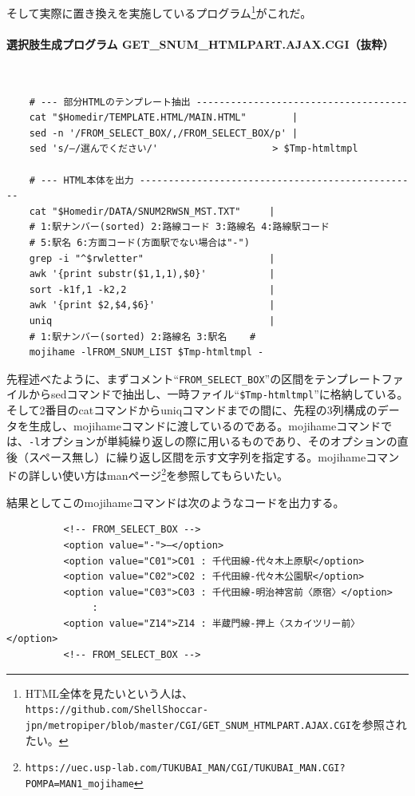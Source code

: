 そして実際に置き換えを実施しているプログラム\footnote{HTML全体を見たいという人は、\\ \verb|https://github.com/ShellShoccar-jpn/metropiper/blob/master/CGI/GET_SNUM_HTMLPART.AJAX.CGI|を参照されたい。}がこれだ。

\paragraph*{選択肢生成プログラム GET\_{}SNUM\_{}HTMLPART.AJAX.CGI（抜粋）} 　\\
\begin{frameboxit}{160.0mm}
\begin{verbatim}
	# --- 部分HTMLのテンプレート抽出 -------------------------------------
	cat "$Homedir/TEMPLATE.HTML/MAIN.HTML"        |
	sed -n '/FROM_SELECT_BOX/,/FROM_SELECT_BOX/p' |
	sed 's/―/選んでください/'                    > $Tmp-htmltmpl
	
	# --- HTML本体を出力 -------------------------------------------------
	cat "$Homedir/DATA/SNUM2RWSN_MST.TXT"     |
	# 1:駅ナンバー(sorted) 2:路線コード 3:路線名 4:路線駅コード
	# 5:駅名 6:方面コード(方面駅でない場合は"-")
	grep -i "^$rwletter"                      |
	awk '{print substr($1,1,1),$0}'           |
	sort -k1f,1 -k2,2                         |
	awk '{print $2,$4,$6}'                    |
	uniq                                      |
	# 1:駅ナンバー(sorted) 2:路線名 3:駅名    #
	mojihame -lFROM_SNUM_LIST $Tmp-htmltmpl -
\end{verbatim}
\end{frameboxit}

先程述べたように、まずコメント``\verb|FROM_SELECT_BOX|''の区間をテンプレートファイルからsedコマンドで抽出し、一時ファイル``\verb|$Tmp-htmltmpl|''に格納している。そして2番目のcatコマンドからuniqコマンドまでの間に、先程の3列構成のデータを生成し、mojihameコマンドに渡しているのである。mojihameコマンドでは、\verb|-l|オプションが単純繰り返しの際に用いるものであり、そのオプションの直後（スペース無し）に繰り返し区間を示す文字列を指定する。mojihameコマンドの詳しい使い方はmanページ\footnote{\verb|https://uec.usp-lab.com/TUKUBAI_MAN/CGI/TUKUBAI_MAN.CGI?POMPA=MAN1_mojihame|}を参照してもらいたい。

結果としてこのmojihameコマンドは次のようなコードを出力する。\\
\begin{frameboxit}{160.0mm}
\begin{verbatim}
	      <!-- FROM_SELECT_BOX -->
	      <option value="-">―</option>
	      <option value="C01">C01 : 千代田線-代々木上原駅</option>
	      <option value="C02">C02 : 千代田線-代々木公園駅</option>
	      <option value="C03">C03 : 千代田線-明治神宮前〈原宿〉</option>
	           :
	      <option value="Z14">Z14 : 半蔵門線-押上〈スカイツリー前〉</option>
	      <!-- FROM_SELECT_BOX -->
\end{verbatim}
\end{frameboxit}

